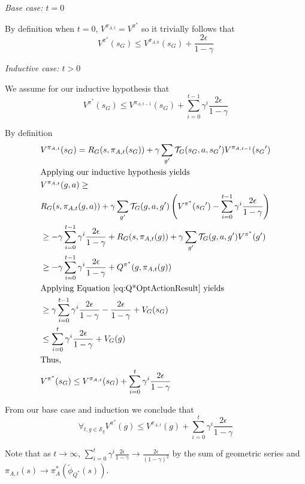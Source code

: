 \documentclass{article}
\newcommand{\ep}{\widetilde \phi}
\newcommand{\epQ}{\ep_{Q^*}}
\begin{document}
\textit{Base case: $t=0$}

By definition when $t=0$, $V^{\pi_{A,t}} = V^{\pi^*}$ so it trivially follows that
\begin{equation}
V^{\pi^*}(s_G) \leq V^{\pi_{A,0}}(s_G) + \frac{2\epsilon}{1-\gamma}
\end{equation}

\textit{Inductive case: $t > 0$}

We assume for our inductive hypothesis that
\begin{equation}
V^{\pi^*}(s_G) \leq V^{\pi_{A,t-1}}(s_G)  + \sum_{i=0}^{t-1}\gamma^i \frac{2\epsilon}{1-\gamma}
\end{equation}

By definition 
\begin{align*}
&V^{\pi_{A,t}}(s_G) = R_G(s, \pi_{A,t}(s_G)) + \gamma \sum_{g'}\mathcal{T}_G(s_G, a, {s_G}')V^{\pi_{A,t-1}}({s_G}')\\
&\text{Applying our inductive hypothesis yields}\\
&V^{\pi_{A,t}}(g, a) \geq\\
&R_G(s, \pi_{A,t}(g, a)) + \gamma \sum_{g'}\mathcal{T}_G(g, a, g')\left(V^{\pi^*}({s_G}') - \sum_{i=0}^{t-1}\gamma^i \frac{2\epsilon}{1-\gamma} \right)\\
&\geq -\gamma\sum_{i=0}^{t-1}\gamma^i \frac{2\epsilon}{1-\gamma} + R_G(s, \pi_{A,t}(g)) + \gamma \sum_{g'}\mathcal{T}_G(g, a, g')V^{\pi^*}(g')\\
&\geq -\gamma\sum_{i=0}^{t-1}\gamma^i \frac{2\epsilon}{1-\gamma} + Q^{\pi^*}(g, \pi_{A,t} (g))\\
&\text{Applying Equation \ref{eq:Q*OptActionResult} yields}\\
&\geq \gamma\sum_{i=0}^{t-1}\gamma^i \frac{2\epsilon}{1-\gamma} - \frac{2\epsilon}{1-\gamma} + V_{G}(s_G)\\
&\leq \sum_{i=0}^{t}\gamma^i \frac{2\epsilon}{1-\gamma} + V_G(g)\\
& \text{Thus,}\\
&V^{\pi^*}(s_G) \leq V^{\pi_{A,t}}(s_G)  + \sum_{i=0}^{t}\gamma^i \frac{2\epsilon}{1-\gamma}
\end{align*}

From our base case and induction we conclude that
\begin{equation}
\forall_{t, g \in \mathcal{S}_g} V^{\pi^*}(g) \leq  V^{\pi_{A,t}}(g) + \sum_{i=0}^{t}\gamma^i \frac{2\epsilon}{1-\gamma}
\end{equation}

Note that as $t \rightarrow \infty$, $\sum_{i=0}^{t}\gamma^i \frac{2\epsilon}{1-\gamma} \rightarrow \frac{2\epsilon}{(1-\gamma)^2}$ by the sum of geometric series and $\pi_{A,t}(s) \rightarrow \pi_A^*(\epQ(s))$.
\end{document}

